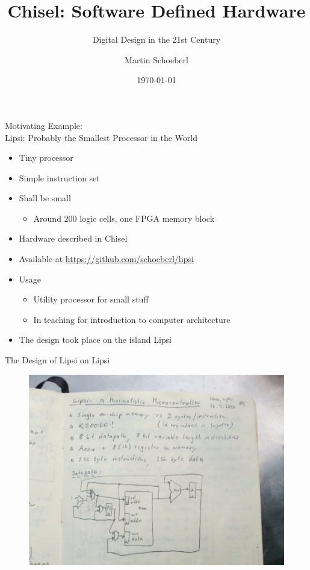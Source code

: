 \documentclass[xcolor=pdflatex,dvipsnames,table]{beamer}
\title{Chisel: Software Defined Hardware}
\subtitle{Digital Design in the 21st Century}
\author{Martin Schoeberl}
\date{\today}
\institute{Technical University of Denmark}
\begin{document}
\begin{frame}
\titlepage
\end{frame}

\begin{frame}[fragile]{Motivating Example:\\
Lipsi: Probably the Smallest Processor in the World}
\begin{itemize}
\item Tiny processor
\item Simple instruction set
\item Shall be small
\begin{itemize}
\item Around 200 logic cells, one FPGA memory block
\end{itemize}
\item Hardware described in Chisel
\item Available at \url{https://github.com/schoeberl/lipsi}
\item Usage
\begin{itemize}
\item Utility processor for small stuff
\item In teaching for introduction to computer architecture
\end{itemize}
\item The design took place on the island Lipsi
\end{itemize}
\end{frame}

\begin{frame}[fragile]{The Design of Lipsi on Lipsi}
\begin{figure}
    \centering
    \includegraphics[scale=0.3]{lipsi}
\end{figure}
\end{frame}
\end{document}
